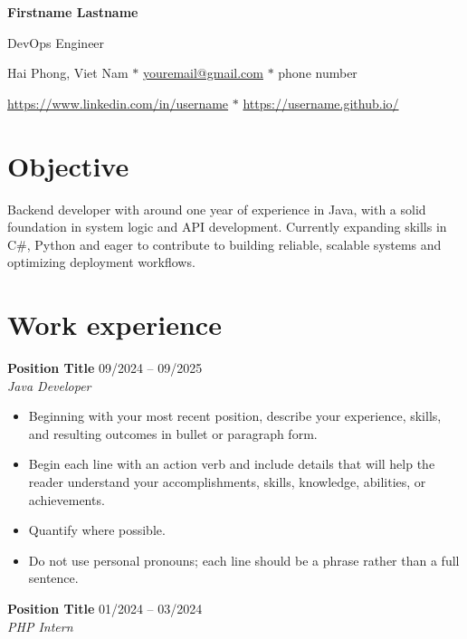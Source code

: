 \documentclass[11pt]{article}
\begin{document}
\begin{center}
{\huge \textbf{Firstname Lastname}}
\vspace{4pt}

{\Large DevOps Engineer}

\vspace{4pt}

Hai Phong, Viet Nam \: $\ast$ \:
\href{mailto:youremail@gmail.com}{youremail@gmail.com}
\: $\ast$ \:
phone number

\href{https://www.linkedin.com/in/username}{https://www.linkedin.com/in/username} \: $\ast$ \:
\href{https://username.github.io/}{https://username.github.io/}
\end{center}

\section*{Objective}
{Backend developer with around one year of experience in Java, with a solid foundation in system logic and API development. 
Currently expanding skills in C\#, Python and eager to contribute to building reliable, scalable systems and optimizing deployment workflows.}

\section*{Work experience}

\noindent \textbf{Position Title} \hfill  09/2024 -- 09/2025 \\
\textit{Java Developer} \hfill %

\begin{itemize}[noitemsep, topsep=0pt, partopsep=0pt, parsep=0pt]
    \item Beginning with your most recent position, describe your experience, skills, and resulting outcomes in bullet or paragraph form.
    \item Begin each line with an action verb and include details that will help the reader understand your accomplishments, skills, knowledge, abilities, or achievements.
    \item Quantify where possible.
    \item Do not use personal pronouns; each line should be a phrase rather than a full sentence.
\end{itemize}

\vspace{6pt}

\noindent \textbf{Position Title} \hfill 01/2024 -- 03/2024 \\
\textit{PHP Intern} \hfill %
\end{document}
